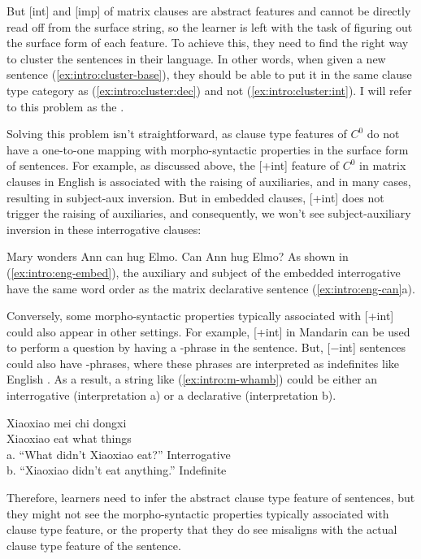 But [\textpm int] and [imp] of matrix clauses are abstract features and cannot be directly read off from the surface string, so the learner is left with the task of figuring out the surface form of each feature. To achieve this, they need to find the right way to cluster the sentences in their language. In other words, when given a new sentence (\ref{ex:intro:cluster-base}), they should be able to put it in the same clause type category as (\ref{ex:intro:cluster:dec}) and not (\ref{ex:intro:cluster:int}). I will refer to this problem as the . 

Solving this problem isn't straightforward, as clause type features of $C^{0}$ do not have a one-to-one mapping with morpho-syntactic properties in the surface form of sentences. For example, as discussed above, the [+int] feature of $C^{0}$ in matrix clauses in English is associated with the raising of auxiliaries, and in many cases, resulting in subject-aux inversion. But in embedded clauses, [+int] does not trigger the raising of auxiliaries, and consequently, we won't see subject-auxiliary inversion in these interrogative clauses: %

Mary wonders 
\eex
{}
\bxl
Ann can hug Elmo.
\ex Can Ann hug Elmo?
\exl
\eex
As shown in (\ref{ex:intro:eng-embed}), the auxiliary  and subject  of the embedded interrogative have the same word order as the matrix declarative sentence (\ref{ex:intro:eng-can}a).


Conversely, some morpho-syntactic properties typically associated with [+int] could also appear in other settings. For example, [+int] in Mandarin can be used to perform a question by having a \twh-phrase in the sentence. But, [$-$int] sentences could also have \twh-phrases, where these phrases are interpreted as indefinites like English . As a result, a string like (\ref{ex:intro:m-whamb}) could be either an interrogative (interpretation a) or a declarative (interpretation b). 


\gll Xiaoxiao mei 	chi 	 dongxi\\ 
Xiaoxiao \Neg{} 	eat	what	things\\
a.	``What didn’t Xiaoxiao eat?''	\hfill Interrogative \twh\\
b.	``Xiaoxiao didn’t eat anything.''		\hfill Indefinite \twh
\eex

Therefore, learners need to infer the abstract clause type feature of sentences, but they might not see the morpho-syntactic properties typically associated with clause type feature, or the property that they do see misaligns with the actual clause type feature of the sentence.


